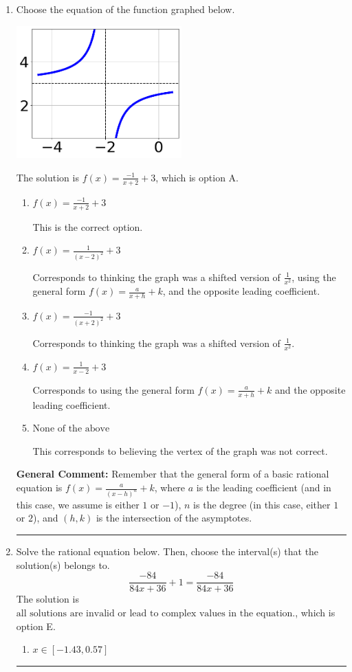 \documentclass{extbook}[14pt]
\newcommand{\litem}[1]{\item #1

\rule{\textwidth}{0.4pt}}
\begin{document}
\begin{enumerate}\litem{
Choose the equation of the function graphed below.

\begin{center}
    \includegraphics[width=0.5\textwidth]{../Figures/rationalGraphToEquationCopyB.png}
\end{center}


The solution is \( f(x) = \frac{-1}{x + 2} + 3 \), which is option A.\begin{enumerate}[label=\Alph*.]
\item \( f(x) = \frac{-1}{x + 2} + 3 \)

This is the correct option.
\item \( f(x) = \frac{1}{(x - 2)^2} + 3 \)

Corresponds to thinking the graph was a shifted version of $\frac{1}{x^2}$, using the general form $f(x) = \frac{a}{x+h}+k$, and the opposite leading coefficient.
\item \( f(x) = \frac{-1}{(x + 2)^2} + 3 \)

Corresponds to thinking the graph was a shifted version of $\frac{1}{x^2}$.
\item \( f(x) = \frac{1}{x - 2} + 3 \)

Corresponds to using the general form $f(x) = \frac{a}{x+h}+k$ and the opposite leading coefficient.
\item \( \text{None of the above} \)

This corresponds to believing the vertex of the graph was not correct.
\end{enumerate}

\textbf{General Comment:} Remember that the general form of a basic rational equation is $ f(x) = \frac{a}{(x-h)^n} + k$, where $a$ is the leading coefficient (and in this case, we assume is either $1$ or $-1$), $n$ is the degree (in this case, either $1$ or $2$), and $(h, k)$ is the intersection of the asymptotes.
}
\litem{
Solve the rational equation below. Then, choose the interval(s) that the solution(s) belongs to.
\[ \frac{-84}{84x + 36} + 1 = \frac{-84}{84x + 36} \]The solution is \( \text{all solutions are invalid or lead to complex values in the equation.} \), which is option E.\begin{enumerate}[label=\Alph*.]
\item \( x \in [-1.43,0.57] \)


\end{enumerate}}
\end{enumerate}
\end{document}

